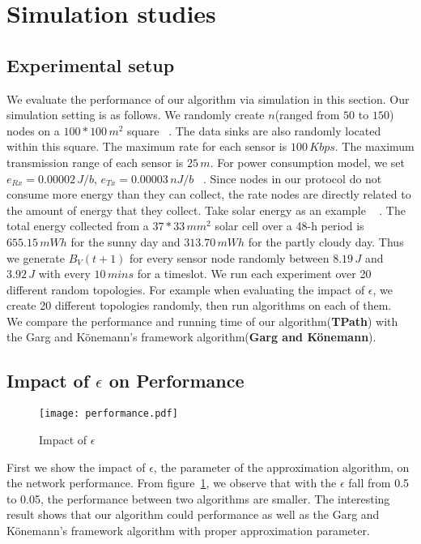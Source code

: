 \documentclass{article}
\begin{document}
\section{Simulation studies}
\subsection{Experimental setup}
We evaluate the performance of our algorithm via simulation in this section.
Our simulation setting is as follows. We randomly create $n$(ranged from $50$ to $150$) nodes
on a $100*100\,m^2$ square ~\cite{Maxi}. The data sinks are also randomly located within this square. The maximum rate for each sensor is $100\,Kbps$. The maximum transmission range of each sensor is $25\,m$. For power consumption model, we set $e_{Rx} = 0.00002\,J/b$, $e_{Tx} = 0.00003\,nJ/b$ ~\cite{Wire}. Since nodes in our protocol do not 
consume more energy than they can collect, the rate nodes are directly related to the amount of energy that they collect. Take solar energy as an example ~\cite{Ste} . The total energy collected from a $37 * 33\,mm^2$ solar cell over a 48-h period is $655.15\,mWh$ for the sunny day and $313.70\,mWh$ for the partly cloudy day. Thus we generate $B_V(t+1)$ for every sensor node randomly between $8.19\,J$ and $3.92\,J$ with every $10\,mins$ for a timeslot. We run each experiment over 20 different random topologies. For example when evaluating the impact of $\epsilon$, we create 20 different topologies randomly, then run algorithms on each of them.\\
We compare the performance and running time of our algorithm(\textbf{TPath}) with the Garg and K\"{o}nemann's framework algorithm(\textbf{Garg and K\"{o}nemann}).

\subsection{Impact of $\epsilon$ on Performance}

\begin{figure}[H]
\centering
\texttt{[image: performance.pdf]} 
\caption{Impact of $\epsilon$}
\label{f1}
\end{figure}

First we show the impact of $\epsilon$, the parameter of the approximation algorithm, on the network performance. From figure~\ref{f1}, we observe that with the $\epsilon$ fall from 0.5 to 0.05, the performance between two algorithms are smaller. The interesting result shows that our algorithm could performance as well as the Garg and K\"{o}nemann's framework algorithm with proper approximation parameter.
\end{document}
